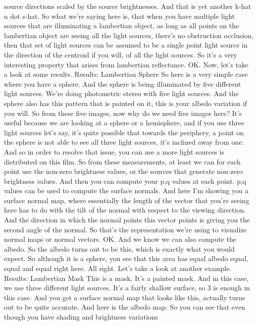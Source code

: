 \documentclass[12pt]{article}
\begin{document}
source directions scaled by the source brightnesses.
And that is yet another k-hat n dot s-hat.
So what we're saying here is, that when
you have multiple light sources that are illuminating
a lambertian object, as long as all points on the lambertian
object are seeing all the light sources,
there's no obstruction occlusion,
then that set of light sources
can be assumed to be a single point light
source in the direction of the centroid if you will,
of all the light sources.
So it's a very interesting property
that arises from lambertian reflectance.
OK.
Now, let's take a look at some results.
Results: Lambertian Sphere
So here is a very simple case where you have a sphere.
And the sphere is being illuminated by five
different light sources.
We're doing photometric stereo with five light sources.
And the sphere also has this pattern that is painted on it,
this is your albedo variation if you will.
So from these five images, now why
do we need five images here?
It's useful because we are looking
at a sphere or a hemisphere, and if you
use three light sources let's say,
it's quite possible that towards the periphery,
a point on the sphere is not able to see all three
light sources, it's inclined away from one.
And so in order to resolve that issue,
you can use a more light sources is distributed on this film.
So from these measurements, at least we can for each point
use the non-zero brightness values,
or the sources that generate non-zero brightness values.
And then you can compute your p,q values at each point.
p,q values can be used to compute the surface normals.
And here I'm showing you a surface normal map,
where essentially the length of the vector that you're
seeing here has to do with the tilt of the normal with respect
to the viewing direction.
And the direction in which the normal
points this vector points is giving you
the second angle of the normal.
So that's the representation we're
using to visualize normal maps or normal vectors.
OK.
And we know we can also compute the albedo.
So the albedo turns out to be this, which is
exactly what you would expect.
So although it is a sphere, you see
that this area has equal albedo equal,
equal and equal right here.
All right.
Let's take a look at another example.
Results: Lambertian Mask
This is a mask.
It's a painted mask.
And in this case, we use three different light sources.
It's a fairly shallow surface, so 3 is enough in this case.
And you get a surface normal map that looks like this, actually
turns out to be quite accurate.
And here is the albedo map.
So you can see that even though you
have shading and brightness variations
\end{document}
